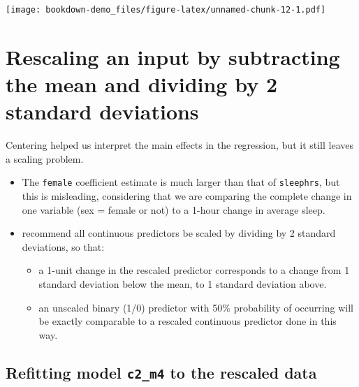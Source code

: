 \documentclass[]{book}
\newenvironment{Shaded}{\begin{snugshade}}{\end{snugshade}}
\newcommand{\KeywordTok}[1]{\textcolor[rgb]{0.13,0.29,0.53}{\textbf{#1}}}
\newcommand{\DataTypeTok}[1]{\textcolor[rgb]{0.13,0.29,0.53}{#1}}
\newcommand{\DecValTok}[1]{\textcolor[rgb]{0.00,0.00,0.81}{#1}}
\newcommand{\StringTok}[1]{\textcolor[rgb]{0.31,0.60,0.02}{#1}}
\newcommand{\OperatorTok}[1]{\textcolor[rgb]{0.81,0.36,0.00}{\textbf{#1}}}
\newcommand{\NormalTok}[1]{#1}
\providecommand{\tightlist}{%
  \setlength{\itemsep}{0pt}\setlength{\parskip}{0pt}}
\theoremstyle{definition}
\theoremstyle{definition}
\theoremstyle{definition}
\theoremstyle{remark}
\begin{document}
\texttt{[image: bookdown-demo\_files/figure-latex/unnamed-chunk-12-1.pdf]}

\section{Rescaling an input by subtracting the mean and dividing by 2
standard
deviations}\label{rescaling-an-input-by-subtracting-the-mean-and-dividing-by-2-standard-deviations}

Centering helped us interpret the main effects in the regression, but it
still leaves a scaling problem.

\begin{itemize}
\tightlist
\item
  The \texttt{female} coefficient estimate is much larger than that of
  \texttt{sleephrs}, but this is misleading, considering that we are
  comparing the complete change in one variable (sex = female or not) to
  a 1-hour change in average sleep.
\item
  \citet{GelmanHill2007} recommend all continuous predictors be scaled
  by dividing by 2 standard deviations, so that:

  \begin{itemize}
  \tightlist
  \item
    a 1-unit change in the rescaled predictor corresponds to a change
    from 1 standard deviation below the mean, to 1 standard deviation
    above.
  \item
    an unscaled binary (1/0) predictor with 50\% probability of
    occurring will be exactly comparable to a rescaled continuous
    predictor done in this way.
  \end{itemize}
\end{itemize}

\begin{Shaded}
\end{Shaded}

\subsection{\texorpdfstring{Refitting model \texttt{c2\_m4} to the
rescaled
data}{Refitting model c2\_m4 to the rescaled data}}\label{refitting-model-c2_m4-to-the-rescaled-data}
\end{document}
